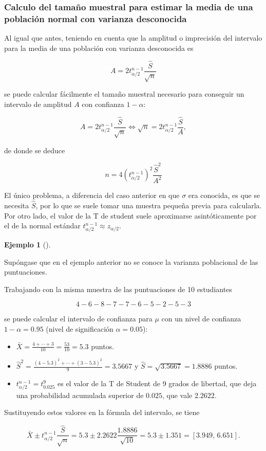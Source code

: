 \documentclass[
  a4paper,
]{scrreport}
\providecommand{\tightlist}{%
  \setlength{\itemsep}{0pt}\setlength{\parskip}{0pt}}\usepackage{longtable,booktabs,array}
\theoremstyle{plain}
\theoremstyle{definition}
\newtheorem{example}{Ejemplo}[chapter]
\theoremstyle{definition}
\theoremstyle{remark}
\begin{document}
\subsubsection{Calculo del tamaño muestral para estimar la media de una
población normal con varianza
desconocida}\label{calculo-del-tamauxf1o-muestral-para-estimar-la-media-de-una-poblaciuxf3n-normal-con-varianza-desconocida}

Al igual que antes, teniendo en cuenta que la amplitud o imprecisión del
intervalo para la media de una población con varianza desconocida es

\[
A= 2 t^{n-1}_{\alpha/2}\frac{\hat{S}}{\sqrt{n}}
\]

se puede calcular fácilmente el tamaño muestral necesario para conseguir
un intervalo de amplitud \(A\) con confianza \(1-\alpha\):

\[
A= 2 t^{n-1}_{\alpha/2}\frac{\hat{S}}{\sqrt{n}} \Leftrightarrow \sqrt{n}= 2 t^{n-1}_{\alpha/2}\frac{\hat{S}}{A},
\]

de donde se deduce

\[
{n = 4 (t^{n-1}_{\alpha/2})^2\frac{\hat{S}^2}{A^2}}
\]

El único problema, a diferencia del caso anterior en que \(\sigma\) era
conocida, es que se necesita \(\hat{S}\), por lo que se suele tomar una
muestra pequeña previa para calcularla. Por otro lado, el valor de la T
de student suele aproximarse asintóticamente por el de la normal
estándar \(t^{n-1}_{\alpha/2}\approx z_{\alpha/2}\).

\begin{example}[]\protect\hypertarget{exm-intervalo-confianza-media-normal-varianza-desconocida}{}\label{exm-intervalo-confianza-media-normal-varianza-desconocida}

Supóngase que en el ejemplo anterior no se conoce la varianza
poblacional de las puntuaciones.

Trabajando con la misma muestra de las puntuaciones de 10 estudiantes

\[
4 - 6 - 8 - 7 - 7 - 6 - 5 - 2 - 5 - 3
\]

se puede calcular el intervalo de confianza para \(\mu\) con un nivel de
confianza \(1-\alpha=0.95\) (nivel de significación \(\alpha=0.05\)):

\begin{itemize}
\tightlist
\item
  \(\bar X = \frac{4+\cdots+3}{10}= \frac{53}{10} = 5.3\) puntos.
\item
  \(\hat{S}^2= \frac{(4-5.3)^2+\cdots+(3-5.3)^2}{9} = 3.5667\) y
  \(\hat{S}=\sqrt{3.5667}=1.8886\) puntos.
\item
  \(t^{n-1}_{\alpha/2}=t^9_{0.025}\) es el valor de la T de Student de 9
  grados de libertad, que deja una probabilidad acumulada superior de
  \(0.025\), que vale \(2.2622\).
\end{itemize}

Sustituyendo estos valores en la fórmula del intervalo, se tiene

\[
\bar{X}\pm t^{n-1}_{\alpha/2}\frac{\hat{S}}{\sqrt{n}} = 5.3\pm 2.2622\frac{1.8886}{\sqrt{10}} = 5.3\pm 1.351 = \left[3.949,\,6.651\right].
\]

\end{example}
\end{document}
